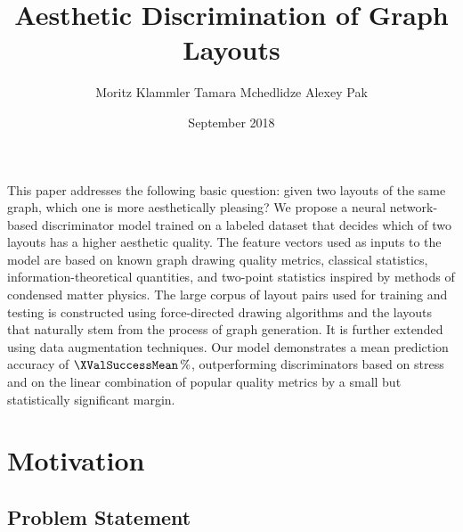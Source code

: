 \documentclass{beamer}
\title{Aesthetic Discrimination of Graph Layouts}
\subtitle{Moritz Klammler {\textand} Tamara Mchedlidze {\textand} Alexey Pak}
\institute[M.~Klammler {\textand} T.~Mchedlidze {\textand} A.~Pak]{%
  26\textsuperscript{th} International Symposium on Graph Drawing and Network Visualization, Barcelona (2018)
}
\date{September 2018}
\begin{document}
\begin{frame}
  \maketitle
\end{frame}

\begin{frame}
  \frametitle{\abstractname}
  \noindent\parbox{\textwidth}{%
    \footnotesize
    This paper addresses the following basic question: given two layouts of the same graph, which one is more
    aesthetically pleasing? We propose a neural network-based discriminator model trained on a labeled dataset that
    decides which of two layouts has a higher aesthetic quality. The feature vectors used as inputs to the model are
    based on known graph drawing quality metrics, classical statistics, information-theoretical quantities, and
    two-point statistics inspired by methods of condensed matter physics. The large corpus of layout pairs used for
    training and testing is constructed using force-directed drawing algorithms and the layouts that naturally stem from
    the process of graph generation. It is further extended using data augmentation techniques. Our model demonstrates a
    mean prediction accuracy of $\XValSuccessMean\percent$, outperforming discriminators based on stress and on the
    linear combination of popular quality metrics by a small but statistically significant margin.
  }
  \vfill
\end{frame}

\section{Motivation}
\subsection{Problem Statement}
\end{document}
